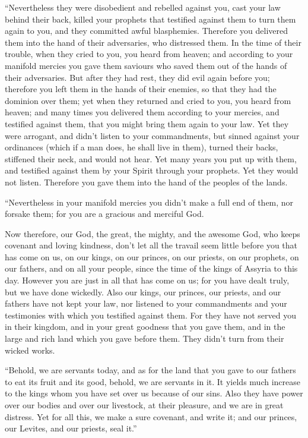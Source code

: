  ``Nevertheless they were disobedient and rebelled against
you, cast your law behind their back, killed your prophets that
testified against them to turn them again to you, and they committed
awful blasphemies.  Therefore you delivered them into the
hand of their adversaries, who distressed them. In the time of their
trouble, when they cried to you, you heard from heaven; and according to
your manifold mercies you gave them saviours who saved them out of the
hands of their adversaries.  But after they had rest, they
did evil again before you; therefore you left them in the hands of their
enemies, so that they had the dominion over them; yet when they returned
and cried to you, you heard from heaven; and many times you delivered
them according to your mercies,  and testified against
them, that you might bring them again to your law. Yet they were
arrogant, and didn't listen to your commandments, but sinned against
your ordinances (which if a man does, he shall live in them), turned
their backs, stiffened their neck, and would not hear.  Yet
many years you put up with them, and testified against them by your
Spirit through your prophets. Yet they would not listen. Therefore you
gave them into the hand of the peoples of the lands.

 ``Nevertheless in your manifold mercies you didn't make a
full end of them, nor forsake them; for you are a gracious and merciful
God.

 Now therefore, our God, the great, the mighty, and the
awesome God, who keeps covenant and loving kindness, don't let all the
travail seem little before you that has come on us, on our kings, on our
princes, on our priests, on our prophets, on our fathers, and on all
your people, since the time of the kings of Assyria to this day.
 However you are just in all that has come on us; for you
have dealt truly, but we have done wickedly.  Also our
kings, our princes, our priests, and our fathers have not kept your law,
nor listened to your commandments and your testimonies with which you
testified against them.  For they have not served you in
their kingdom, and in your great goodness that you gave them, and in the
large and rich land which you gave before them. They didn't turn from
their wicked works.

 ``Behold, we are servants today, and as for the land that
you gave to our fathers to eat its fruit and its good, behold, we are
servants in it.  It yields much increase to the kings whom
you have set over us because of our sins. Also they have power over our
bodies and over our livestock, at their pleasure, and we are in great
distress.  Yet for all this, we make a sure covenant, and
write it; and our princes, our Levites, and our priests, seal it.''

